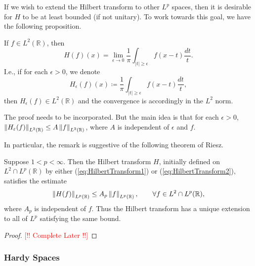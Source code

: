 \documentclass{article}
\begin{document}
If we wish to extend the Hilbert transform to other $L^{p}$ spaces, then it is desirable for $H$ to be at least bounded (if not unitary). To work towards this goal, we have the following proposition. 
\begin{prop}
	If $f \in L^{2}(\mathbb{R})$, then 
	\begin{equation}
		H(f)(x) = \lim_{\epsilon \to 0}\frac{1}{\pi}\int_{|t|\geq \epsilon}f(x - t)\frac{dt}{t}. 
		\label{eq:HilbertTransform2} 
	\end{equation}
	I.e., if for each $\epsilon > 0$, we denote 
	\begin{equation*}
		H_{\epsilon}(f)(x) \coloneqq \frac{1}{\pi} \int_{|t|\geq \epsilon}f(x - t)\frac{dt}{t}, 
	\end{equation*} 
	then $H_{\epsilon}(f) \in L^{2}(\mathbb{R})$ and the convergence is accordingly in the $L^{2}$ norm. 
\end{prop} 
\begin{remark}
	The proof needs to be incorporated. But the main idea is that for each $\epsilon > 0$, $\left\Vert H_{\varepsilon}(f) \right\Vert_{L^{2}(\mathbb{R})} \leq A \left\Vert f \right\Vert_{L^{2}(\mathbb{R})}$, where $A$ is independent of $\epsilon$ and $f$. 
\end{remark} 
In particular, the remark is suggestive of the following theorem of Riesz. 
\begin{theorem}
	Suppose $1 < p < \infty$. Then the Hilbert transform $H$, initially defined on $L^{2} \cap L^{p}(\mathbb{R})$ by either (\ref{eq:HilbertTransform1}) or (\ref{eq:HilbertTransform2}), satisfies the estimate 
	\begin{equation}
		\left\Vert H(f) \right\Vert_{L^{p}(\mathbb{R})} \leq A_{p}\left\Vert f \right\Vert_{L^{p}(\mathbb{R})}, \qquad \forall f \in L^{2} \cap L^{p}(\mathbb{R}), 
	\end{equation}
	where $A_{p}$ is independent of $f$. Thus the Hilbert transform has a unique extension to all of $L^{p}$ satisfying the same bound. 
	\label{thm:RieszThmHilbertTrans}
\end{theorem} 
\begin{proof}
	\textcolor{red}{[!! Complete Later !!]}
\end{proof} 

\subsubsection{Hardy Spaces}
\end{document}
